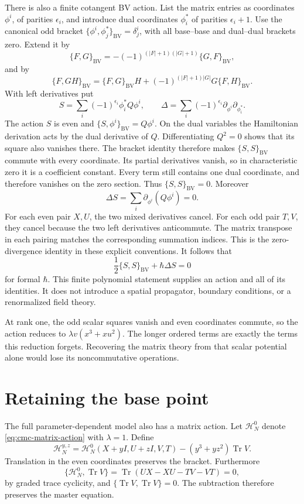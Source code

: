 There is also a finite cotangent BV action. List the matrix
entries as coordinates \(\phi^i\), of parities \(\epsilon_i\),
and introduce dual coordinates \(\phi_i^*\) of parities
\(\epsilon_i+1\). Use the canonical odd bracket
\(\{\phi^i,\phi_j^*\}_{\mathrm{BV}}=\delta^i_j\), with all
base--base and dual--dual brackets zero. Extend it by
\[
 \{F,G\}_{\mathrm{BV}}
 =-(-1)^{(|F|+1)(|G|+1)}\{G,F\}_{\mathrm{BV}},
\]
and by
\[
 \{F,GH\}_{\mathrm{BV}}
 =\{F,G\}_{\mathrm{BV}}H
   +(-1)^{(|F|+1)|G|}G\{F,H\}_{\mathrm{BV}}.
\] With left derivatives put
\[
 S=\sum_i(-1)^{\epsilon_i}\phi_i^*Q\phi^i,\qquad
 \Delta=\sum_i(-1)^{\epsilon_i}
             \partial_{\phi^i}\partial_{\phi_i^*}.
\]
The action \(S\) is even and
\(\{S,\phi^i\}_{\mathrm{BV}}=Q\phi^i\).
On the dual variables the Hamiltonian derivation acts by the
dual derivative of \(Q\). Differentiating \(Q^2=0\) shows that
its square also vanishes there. The bracket identity therefore makes \(\{S,S\}_{\mathrm{BV}}\)
commute with every coordinate. Its partial derivatives vanish,
so in characteristic zero it is a coefficient constant. Every
term still contains one dual coordinate, and therefore vanishes
on the zero section. Thus \(\{S,S\}_{\mathrm{BV}}=0\).
Moreover
\[
 \Delta S=\sum_i\partial_{\phi^i}(Q\phi^i)=0.
\]
For each even pair \(X,U\), the two mixed derivatives cancel.
For each odd pair \(T,V\), they cancel because the two left
derivatives anticommute. The matrix transpose in each pairing
matches the corresponding summation indices. This is the
zero-divergence identity in these explicit conventions.
It follows that
\[
 \frac12\{S,S\}_{\mathrm{BV}}+\hbar\Delta S=0
\]
for formal \(\hbar\).
This finite polynomial statement supplies an action and all
of its identities. It does not introduce a spatial propagator,
boundary conditions, or a renormalized field theory.

At rank one, the odd scalar squares vanish and even
coordinates commute, so the action reduces to
\(\lambda v(x^3+xu^2)\).
The longer ordered terms are exactly the terms this reduction
forgets. Recovering the matrix theory from that scalar
potential alone would lose its noncommutative operations.

\section{Retaining the base point}

The full parameter-dependent model also has a matrix action.
Let \(\mathcal H_N^0\) denote
\eqref{eq:cmc-matrix-action} with \(\lambda=1\). Define
\[
 \mathcal H_N^{y,z}
 =\mathcal H_N^0(X+yI,U+zI,V,T)
       -(y^3+yz^2)\operatorname{Tr}V.
\]
Translation in the even coordinates preserves the bracket.
Furthermore
\[
 \{\mathcal H_N^0,\operatorname{Tr}V\}
 =\operatorname{Tr}(UX-XU-TV-VT)=0,
\]
by graded trace cyclicity, and
\(\{\operatorname{Tr}V,\operatorname{Tr}V\}=0\).
The subtraction therefore preserves the master equation.

